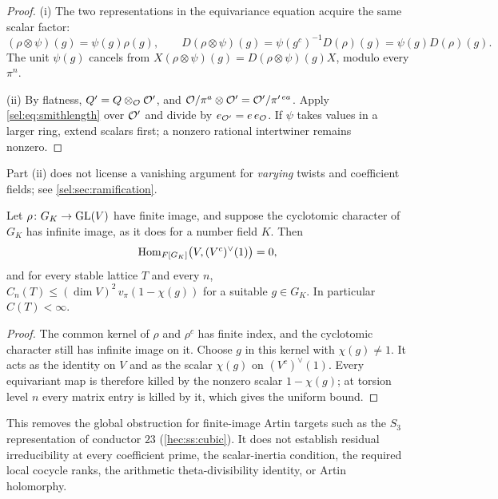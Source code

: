 \begin{proof}
(i) The two representations in the equivariance equation acquire the same
scalar factor:
\[
 (\rho\otimes\psi)(g)=\psi(g)\rho(g),\qquad
 D(\rho\otimes\psi)(g)=\psi(g^c)^{-1}D(\rho)(g)=\psi(g)D(\rho)(g).
\]
The unit $\psi(g)$ cancels from
$X(\rho\otimes\psi)(g)=D(\rho\otimes\psi)(g)X$, modulo every $\pi^n$.

(ii) By flatness, $Q'=Q\otimes_{\mathcal{O}}\mathcal{O}'$, and
$\mathcal{O}/\pi^{a}\otimes\mathcal{O}'=\mathcal{O}'/\pi'^{\,ea}$. Apply
\eqref{sel:eq:smithlength} over $\mathcal{O}'$ and divide by
$e_{\mathcal{O}'}=e\,e_{\mathcal{O}}$. If $\psi$ takes values in a larger ring, extend
scalars first; a nonzero rational intertwiner remains nonzero.
\end{proof}

Part (ii) does not license a vanishing argument for \emph{varying} twists
and coefficient fields; see \cref{sel:sec:ramification}.

\begin{proposition}\label{sel:prop:finiteimage}
Let $\rho\colon G_K\to\operatorname{GL}(V)$ have finite image, and suppose the cyclotomic
character of $G_K$ has infinite image, as it does for a number field $K$.
Then
\[
 \operatorname{Hom}_{F[G_K]}\bigl(V,(V^c)^\vee(1)\bigr)=0,
\]
and for every stable lattice $T$ and every $n$,
$C_n(T)\le(\dim V)^2\,v_\pi(1-\chi(g))$ for a suitable $g\in G_K$. In
particular $C(T)<\infty$.
\end{proposition}

\begin{proof}
The common kernel of $\rho$ and $\rho^c$ has finite index, and the
cyclotomic character still has infinite image on it. Choose $g$ in this
kernel with $\chi(g)\ne1$. It acts as the identity on $V$ and as the scalar
$\chi(g)$ on $(V^c)^\vee(1)$. Every equivariant map is therefore killed by
the nonzero scalar $1-\chi(g)$; at torsion level $n$ every matrix entry is
killed by it, which gives the uniform bound.
\end{proof}

This removes the global obstruction for finite-image Artin targets such as
the $S_3$ representation of conductor $23$ (\cref{hec:ss:cubic}). It does not
establish residual irreducibility at every coefficient prime, the
scalar-inertia condition, the required local cocycle ranks, the arithmetic
theta-divisibility identity, or Artin holomorphy.

